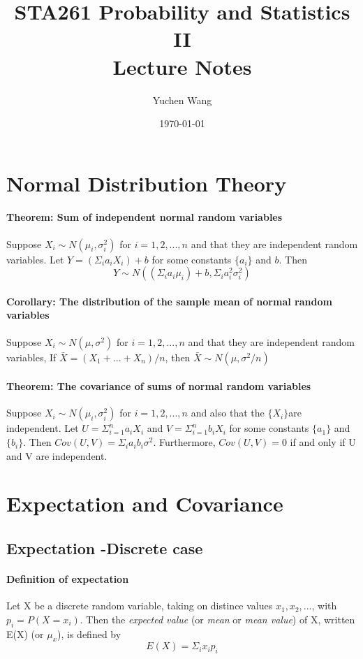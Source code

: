 \documentclass[11pt]{article}
\title{STA261 Probability and Statistics II \\ Lecture Notes}
\author{Yuchen Wang}
\date{\today}
\newcommand{\ti}[1]{\textit{#1}}
\begin{document}
	\maketitle
	\tableofcontents
	\newpage
\section{Normal Distribution Theory}
\paragraph{Theorem: Sum of independent normal random variables}
Suppose $X_i \sim N(\mu_i, \sigma^2_i)$ for $i = 1, 2,...,n$ and that they are independent random variables. Let $Y = (\Sigma_ia_iX_i) + b$ for some constants $\{a_i\}$ and $b$. Then
$$Y \sim N((\Sigma_ia_i\mu_i)+b, \Sigma_ia^2_i\sigma^2_i)$$
\paragraph{Corollary: The distribution of the sample mean of normal random variables} Suppose $X_i \sim N(\mu, \sigma^2)$ for $i=1,2,...,n$ and that they are independent random variables, If $\bar X = (X_1 + ... +X_n)/n$, then $\bar X \sim N(\mu,\sigma^2/n)$
\paragraph{Theorem: The covariance of sums of normal random variables}Suppose $X_i \sim N(\mu_i, \sigma_i^2)$ for $i=1,2,...,n$ and also that the $\{X_i\} $are independent. Let $U=\Sigma^n_{i=1}a_iX_i$ and $V=\Sigma^n_{i=1}b_iX_i$ for some constants $\{a_1\}$ and $\{b_i\}$. Then $Cov(U,V) = \Sigma_ia_ib_i\sigma^2$. Furthermore, $Cov(U,V) = 0$ if and only if U and V are independent.

\section{Expectation and Covariance}
\subsection{Expectation -Discrete case}
\paragraph{Definition of expectation} Let X be a discrete random variable, taking on distince values $x_1,x_2,...$, with $p_i = P(X = x_i)$. Then the \ti{expected value} (or \ti{mean} or \ti{mean value}) of X, written E(X) (or $\mu_x$), is defined by $$E(X) = \Sigma_i x_ip_i$$
\end{document}
